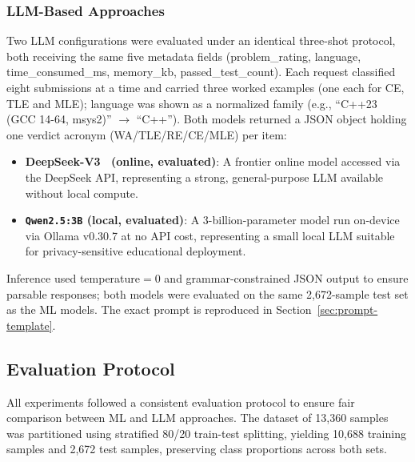 \documentclass[acmsmall]{acmart}
\begin{document}
\subsubsection*{LLM-Based Approaches}
Two LLM configurations were evaluated under an identical three-shot protocol,
both receiving the same five metadata fields (problem\_rating, language,
time\_consumed\_ms, memory\_kb, passed\_test\_count). Each request classified
eight submissions at a time and carried three worked examples (one each for CE,
TLE and MLE); language was shown as a normalized family (e.g.,
``C++23 (GCC 14-64, msys2)'' $\rightarrow$ ``C++''). Both models returned a
JSON object holding one verdict acronym (WA/TLE/RE/CE/MLE) per item:
\begin{itemize}
 \item \textbf{DeepSeek-V3~\cite{deepseek2024deepseekv3} (online, evaluated)}: A frontier online model
 accessed via the DeepSeek API, representing a strong,
 general-purpose LLM available without local compute.
 \item \textbf{\texttt{Qwen2.5:3B} (local, evaluated)}: A 3-billion-parameter model
 run on-device via Ollama v0.30.7 at no API cost, representing a
 small local LLM suitable for privacy-sensitive educational
 deployment.
\end{itemize}
Inference used temperature$=0$ and grammar-constrained JSON output to ensure
parsable responses; both models were evaluated on the same 2,672-sample test
set as the ML models. The exact prompt is reproduced in
Section~\ref{sec:prompt-template}.

\subsection{Evaluation Protocol}\label{sec:eval}

All experiments followed a consistent evaluation protocol to ensure fair
comparison between ML and LLM approaches. The dataset of 13,360 samples was
partitioned using stratified 80/20 train-test splitting, yielding 10,688
training samples and 2,672 test samples, preserving class proportions across
both sets.
\end{document}

